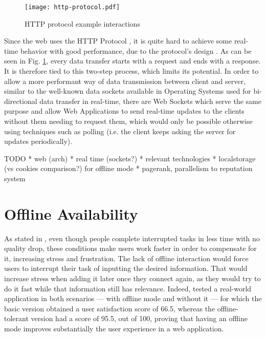 \begin{figure}[t]
    \begin{center}
      \leavevmode
      \texttt{[image: http-protocol.pdf]}
      \caption{HTTP protocol example interactions}
      \label{fig:http-protocol}
    \end{center}
  \end{figure}

Since the web uses the HTTP Protocol \cite{http1-1protocol} \cite{http2protocol}, it is quite hard to achieve some real-time behavior with good performance, due to the protocol's design \cite{Spero1994}. As can be seen in Fig. \ref{fig:http-protocol}, every data transfer starts with a request and ends with a response. It is therefore tied to this two-step process, which limits its potential. In order to allow a more performant way of data transmission between client and server, similar to the well-known data sockets available in Operating Systems used for bi-directional data transfer in real-time, there are Web Sockets \cite{websocket-protocol} which serve the same purpose and allow Web Applications to send real-time updates to the clients without them needing to request them, which would only be possible otherwise using techniques such as polling (i.e. the client keeps asking the server for updates periodically). 


TODO
* web (arch)
* real time (sockets?)
* relevant technologies
* localstorage (vs cookies comparison?) for offline mode
* pagerank, parallelism to reputation system

\section{Offline Availability}\label{sec:offline-avail-sota}

As stated in \cite{Mark2008}, even though people complete interrupted tasks in less time with no quality drop, these conditions make users work faster in order to compensate for it, increasing stress and frustration. The lack of offline interaction would force users to interrupt their task of inputting the desired information. That would increase stress when adding it later once they connect again, as they would try to do it fast while that information still has relevance. Indeed, \cite{Marco2015} tested a real-world application in both scenarios --- with offline mode and without it --- for which the basic version obtained a user satisfaction score of 66.5, whereas the offline-tolerant version had a score of 95.5, out of 100, proving that having an offline mode improves substantially the user experience in a web application. 

